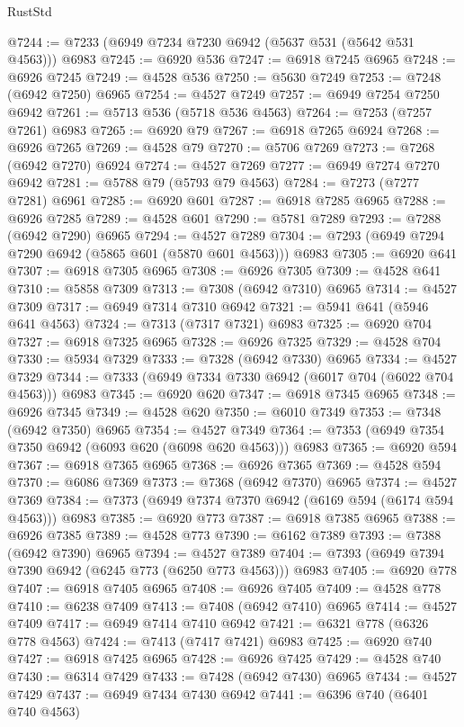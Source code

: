 \begin{lexlean}{RustStd}
\begin{coremodule}
@7244 := @7233 (@6949 @7234 @7230 @6942 (@5637 @531 (@5642 @531 @4563))) @6983
@7245 := @6920 @536
@7247 := @6918 @7245 @6965
@7248 := @6926 @7245
@7249 := @4528 @536
@7250 := @5630 @7249
@7253 := @7248 (@6942 @7250) @6965
@7254 := @4527 @7249
@7257 := @6949 @7254 @7250 @6942
@7261 := @5713 @536 (@5718 @536 @4563)
@7264 := @7253 (@7257 @7261) @6983
@7265 := @6920 @79
@7267 := @6918 @7265 @6924
@7268 := @6926 @7265
@7269 := @4528 @79
@7270 := @5706 @7269
@7273 := @7268 (@6942 @7270) @6924
@7274 := @4527 @7269
@7277 := @6949 @7274 @7270 @6942
@7281 := @5788 @79 (@5793 @79 @4563)
@7284 := @7273 (@7277 @7281) @6961
@7285 := @6920 @601
@7287 := @6918 @7285 @6965
@7288 := @6926 @7285
@7289 := @4528 @601
@7290 := @5781 @7289
@7293 := @7288 (@6942 @7290) @6965
@7294 := @4527 @7289
@7304 := @7293 (@6949 @7294 @7290 @6942 (@5865 @601 (@5870 @601 @4563))) @6983
@7305 := @6920 @641
@7307 := @6918 @7305 @6965
@7308 := @6926 @7305
@7309 := @4528 @641
@7310 := @5858 @7309
@7313 := @7308 (@6942 @7310) @6965
@7314 := @4527 @7309
@7317 := @6949 @7314 @7310 @6942
@7321 := @5941 @641 (@5946 @641 @4563)
@7324 := @7313 (@7317 @7321) @6983
@7325 := @6920 @704
@7327 := @6918 @7325 @6965
@7328 := @6926 @7325
@7329 := @4528 @704
@7330 := @5934 @7329
@7333 := @7328 (@6942 @7330) @6965
@7334 := @4527 @7329
@7344 := @7333 (@6949 @7334 @7330 @6942 (@6017 @704 (@6022 @704 @4563))) @6983
@7345 := @6920 @620
@7347 := @6918 @7345 @6965
@7348 := @6926 @7345
@7349 := @4528 @620
@7350 := @6010 @7349
@7353 := @7348 (@6942 @7350) @6965
@7354 := @4527 @7349
@7364 := @7353 (@6949 @7354 @7350 @6942 (@6093 @620 (@6098 @620 @4563))) @6983
@7365 := @6920 @594
@7367 := @6918 @7365 @6965
@7368 := @6926 @7365
@7369 := @4528 @594
@7370 := @6086 @7369
@7373 := @7368 (@6942 @7370) @6965
@7374 := @4527 @7369
@7384 := @7373 (@6949 @7374 @7370 @6942 (@6169 @594 (@6174 @594 @4563))) @6983
@7385 := @6920 @773
@7387 := @6918 @7385 @6965
@7388 := @6926 @7385
@7389 := @4528 @773
@7390 := @6162 @7389
@7393 := @7388 (@6942 @7390) @6965
@7394 := @4527 @7389
@7404 := @7393 (@6949 @7394 @7390 @6942 (@6245 @773 (@6250 @773 @4563))) @6983
@7405 := @6920 @778
@7407 := @6918 @7405 @6965
@7408 := @6926 @7405
@7409 := @4528 @778
@7410 := @6238 @7409
@7413 := @7408 (@6942 @7410) @6965
@7414 := @4527 @7409
@7417 := @6949 @7414 @7410 @6942
@7421 := @6321 @778 (@6326 @778 @4563)
@7424 := @7413 (@7417 @7421) @6983
@7425 := @6920 @740
@7427 := @6918 @7425 @6965
@7428 := @6926 @7425
@7429 := @4528 @740
@7430 := @6314 @7429
@7433 := @7428 (@6942 @7430) @6965
@7434 := @4527 @7429
@7437 := @6949 @7434 @7430 @6942
@7441 := @6396 @740 (@6401 @740 @4563)

\end{coremodule}
\end{lexlean}
